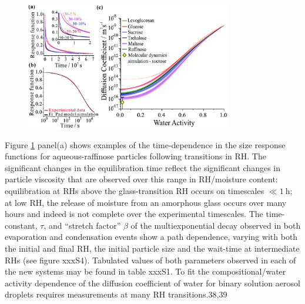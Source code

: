 \begin{figure}
    \centering
    \includegraphics[width=0.8\textwidth]{chapters/water_hopping/figures/f1.png}
    \label{fig:wat_workflow}
\end{figure}

 Figure \ref{fig:wat_workflow} panel(a) shows examples of the time-dependence in the size response functions for aqueous-raffinose particles following transitions in RH. The significant changes in the equilibration time reflect the significant changes in particle viscosity that are observed over this range in RH/moisture content: equilibration at RHs above the glass-transition RH occurs on timescales $\ll \SI{1}{\hour}$; at low RH, the release of moisture from an amorphous glass occurs over many hours and indeed is not complete over the experimental timescales. The time-constant, $\tau$, and ``stretch factor” $\beta$ of the multiexponential decay observed in both evaporation and condensation events show a path dependence, varying with both the initial and final RH, the initial particle size and the wait-time at intermediate RHs (see figure xxxS4). Tabulated values of both parameters observed in each of the new systems may be found in table xxxS1. To fit the compositional/water activity dependence of the diffusion coefficient of water for binary solution aerosol droplets requires measurements at many RH transitions.38,39

